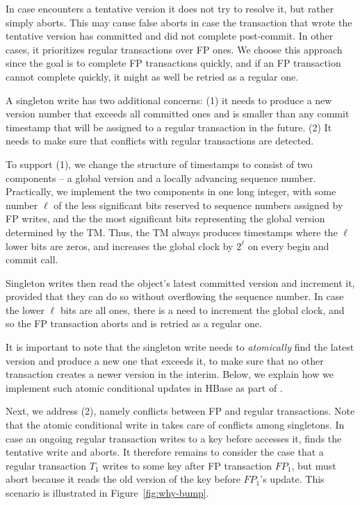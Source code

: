 In case   encounters a tentative version it does not try to resolve it, but rather simply aborts.
This may cause false aborts in case the transaction that wrote the tentative version has committed and did not 
complete post-commit. In other cases, it prioritizes regular transactions over FP ones. We choose this approach since
the goal is to complete FP transactions quickly, and if an FP transaction cannot complete quickly, it might as well be 
retried as a regular one.
   
A singleton write has two additional concerns: (1) it needs to  produce a new version number that exceeds all committed ones and
is smaller than any commit timestamp that will be assigned to a regular transaction in the future.
(2)  It needs to make sure that conflicts with regular transactions are detected. 

To support (1), we change the structure of timestamps to consist of two 
components -- a global version and a locally advancing sequence number.
Practically, we implement the two components in one long integer, with some number $\ell$ of the less significant bits
reserved to sequence numbers assigned by FP writes, and the the most significant bits representing 
the global version determined by the TM. Thus, the TM always produces timestamps where the $\ell$ lower bits are zeros,
and increases the global clock by $2^\ell$ on every begin and commit call.  

Singleton writes then read the object's latest committed version and increment it, provided that they can do so 
 without overflowing the sequence number. 
In case the lower $\ell$ bits are all ones, there is a need to increment the global clock, and so the FP transaction aborts and is retried
as a regular one. 

It is important to note that the singleton write needs to \emph{atomically} find the latest version and produce a new one that exceeds it, 
to make sure that no other transaction creates a newer version in the interim.
Below, we explain how we implement such atomic conditional updates in HBase as part of \sys. 

Next, we address (2), namely conflicts between FP and regular transactions.
Note that the atomic conditional write in  takes care of conflicts among singletons.
In case an ongoing regular transaction writes to a key before  accesses it, 
 finds the tentative write and aborts. It therefore remains to consider the case that
a regular transaction $T_1$ writes to some key after FP transaction $FP_1$, but must abort because 
it reads the old version of the key before $FP_1$'s update. This scenario is illustrated in Figure~\ref{fig:why-bump}. 

